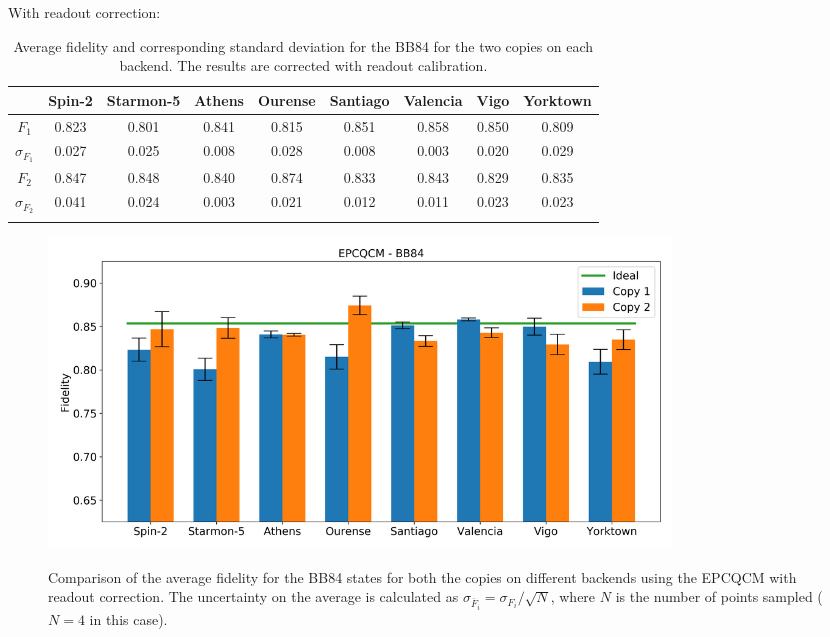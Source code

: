 With readout correction:
\begin{table}[H]
    \centering
    \begin{tabular}{|c|c|c|c|c|c|c|c|c|}
    \hline
    \textbf{} & \textbf{Spin-2} & \textbf{Starmon-5} & \textbf{Athens} & \textbf{Ourense} & \textbf{Santiago} & \textbf{Valencia} & \textbf{Vigo} & \textbf{Yorktown} \\ \hline
    $F_1$              & 0.823 & 0.801 & 0.841 & 0.815 & 0.851 & 0.858 & 0.850 & 0.809 \\ \hline
    $\sigma_{F_1}$     & 0.027 & 0.025 & 0.008 & 0.028 & 0.008 & 0.003 & 0.020 & 0.029 \\ \hline
    $F_2$              & 0.847 & 0.848 & 0.840 & 0.874 & 0.833 & 0.843 & 0.829 & 0.835 \\ \hline
    $\sigma_{F_2}$     & 0.041 & 0.024 & 0.003 & 0.021 & 0.012 & 0.011 & 0.023 & 0.023 \\ \hline
    \caption{Average fidelity and corresponding standard deviation for the BB84 for the two copies on each backend. The results are corrected with readout calibration.}
    \end{tabular}
\end{table}
\begin{figure}[H]
  \centering
          \includegraphics[width=0.8\textwidth]{Figures/Economical/Histograms/histo_bb84_corrected.png}
      \label{fig:epc_histo_bb84_corrected}
      \caption{Comparison of the average fidelity for the BB84 states for both the copies on different backends using the EPCQCM with readout correction. The uncertainty on the average is calculated as $\sigma_{\overline{F}_i}=\sigma_{F_i}/\sqrt{N}$, where $N$ is the number of points sampled ($N=4$ in this case).}
\end{figure}

